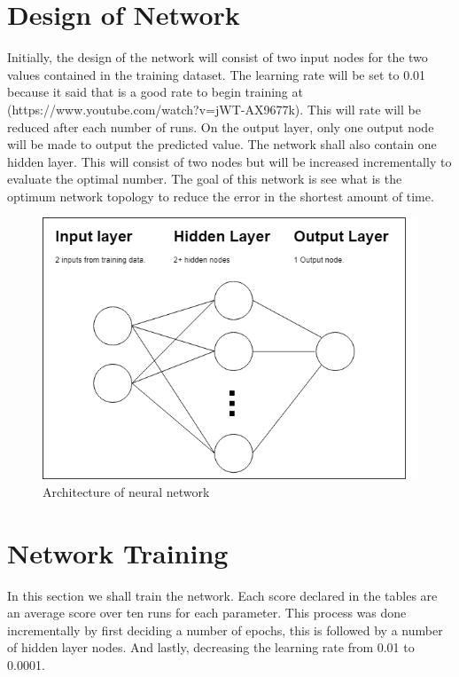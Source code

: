 
\section*{Design of Network}
%
Initially, the design of the network will consist of two input nodes for the two values contained in the training dataset. The learning rate will be set to 0.01 because it said that is a good rate to begin training at (https://www.youtube.com/watch?v=jWT-AX9677k). This will rate will be reduced after each number of runs. On the output layer, only one output node will be made to output the predicted value.
The network shall also contain one hidden layer. This will consist of two nodes but will be increased incrementally to evaluate the optimal number.
The goal of this network is see what is the optimum network topology to reduce the error in the shortest amount of time. 

\begin{figure}[ht]
	\begin{center}
		\advance\leftskip-3cm
		\advance\rightskip-3cm
		\includegraphics[keepaspectratio=true,scale=0.6]{__resources/networkarch.png}
		\caption{Architecture of neural network}
		\label{member2}
	\end{center}
\end{figure}

\newpage
\section*{Network Training}
In this section we shall train the network. Each score declared in the tables are an average score over ten runs for each parameter. This process was done incrementally by first deciding a number of epochs, this is followed by a number of hidden layer nodes. And lastly, decreasing the learning rate from 0.01 to 0.0001.

